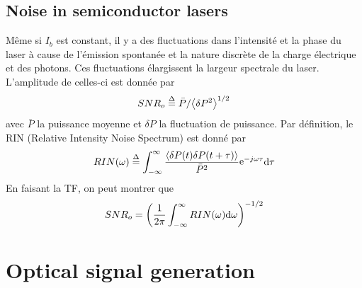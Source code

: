 \subsection{Noise in semiconductor lasers}
Même si $I_b$ est constant, il y a des fluctuations dans l'intensité et la phase du laser à cause de
l'émission spontanée et la nature discrète de la charge électrique et des photons. Ces fluctuations 
élargissent la largeur spectrale du laser. L'amplitude de celles-ci est donnée par 
\begin{equation}
SN{R_o} \buildrel \Delta \over = \bar P/{\left\langle {\delta {P^2}} \right\rangle ^{1/2}}
\end{equation}
avec $\bar{P}$ la puissance moyenne et $\delta P$ la fluctuation de puissance. Par définition, le
RIN (Relative Intensity Noise Spectrum) est donné par
\begin{equation}
RIN(\omega ) \buildrel \Delta \over = \int_{ - \infty }^\infty  {\frac{{\left\langle {\delta P(t)\delta P(t + \tau )} \right\rangle }}{{{{\bar P}^2}}}{{\mathop{\rm e}\nolimits} ^{ - j\omega \tau }}{\rm{d}}} \tau 
\end{equation}
En faisant la TF, on peut montrer que
\begin{equation}
SN{R_o} = {\left( {\frac{1}{{2\pi }}\int_{ - \infty }^\infty  {RIN(\omega ){\rm{d}}\omega } } \right)^{ - 1/2}}
\end{equation}




\section{Optical signal generation}
